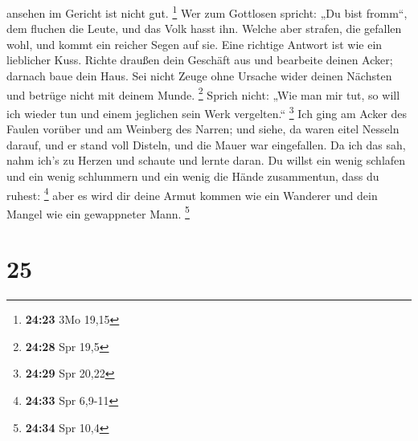 ansehen im Gericht ist nicht gut. \footnote{\textbf{24:23} 3Mo 19,15}
 Wer zum Gottlosen spricht: „Du bist fromm``, dem fluchen
die Leute, und das Volk hasst ihn.  Welche aber strafen,
die gefallen wohl, und kommt ein reicher Segen auf sie. 
Eine richtige Antwort ist wie ein lieblicher Kuss. 
Richte draußen dein Geschäft aus und bearbeite deinen Acker; darnach
baue dein Haus.  Sei nicht Zeuge ohne Ursache wider
deinen Nächsten und betrüge nicht mit deinem Munde. \footnote{\textbf{24:28}
  Spr 19,5}  Sprich nicht: „Wie man mir tut, so will ich
wieder tun und einem jeglichen sein Werk vergelten.`` \footnote{\textbf{24:29}
  Spr 20,22}  Ich ging am Acker des Faulen vorüber und am
Weinberg des Narren;  und siehe, da waren eitel Nesseln
darauf, und er stand voll Disteln, und die Mauer war eingefallen.
 Da ich das sah, nahm ich's zu Herzen und schaute und
lernte daran.  Du willst ein wenig schlafen und ein wenig
schlummern und ein wenig die Hände zusammentun, dass du ruhest:
\footnote{\textbf{24:33} Spr 6,9-11}  aber es wird dir
deine Armut kommen wie ein Wanderer und dein Mangel wie ein gewappneter
Mann. \footnote{\textbf{24:34} Spr 10,4}

\hypertarget{section-12}{%
\section{25}\label{section-12}}

